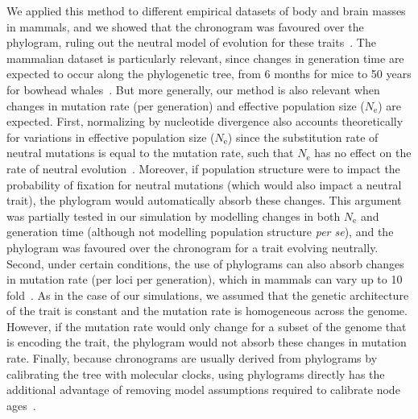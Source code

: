 \documentclass{article}
\newcommand{\Ne}{N_{\text{e}}}
\begin{document}
We applied this method to different empirical datasets of body and brain masses in mammals, and we showed that the chronogram was favoured over the phylogram, ruling out the neutral model of evolution for these traits~\citep{latrille_detecting_2024}.
The mammalian dataset is particularly relevant, since changes in generation time are expected to occur along the phylogenetic tree, from 6 months for mice to 50 years for bowhead whales~\citep{demagalhaes_database_2009, nielsen_eye_2016}.
But more generally, our method is also relevant when changes in mutation rate (per generation) and effective population size ($\Ne$) are expected.
First, normalizing by nucleotide divergence also accounts theoretically for variations in effective population size ($\Ne$) since the substitution rate of neutral mutations is equal to the mutation rate, such that $\Ne$ has no effect on the rate of neutral evolution~\citep{kimura_evolutionary_1968, ohta_population_1972}.
Moreover, if population structure were to impact the probability of fixation for neutral mutations (which would also impact a neutral trait), the phylogram would automatically absorb these changes.
This argument was partially tested in our simulation by modelling changes in both $\Ne$ and generation time (although not modelling population structure \textit{per se}), and the phylogram was favoured over the chronogram for a trait evolving neutrally.
Second, under certain conditions, the use of phylograms can also absorb changes in mutation rate (per loci per generation), which in mammals can vary up to 10 fold~\citep{bergeron_evolution_2023}.
As in the case of our simulations, we assumed that the genetic architecture of the trait is constant and the mutation rate is homogeneous across the genome.
However, if the mutation rate would only change for a subset of the genome that is encoding the trait, the phylogram would not absorb these changes in mutation rate.
Finally, because chronograms are usually derived from phylograms by calibrating the tree with molecular clocks, using phylograms directly has the additional advantage of removing model assumptions required to calibrate node ages~\citep{litsios_effects_2012}.
\end{document}
